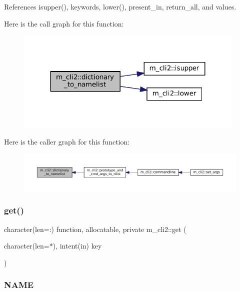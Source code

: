 References isupper(), keywords, lower(), present\+\_\+in, return\+\_\+all, and values.

Here is the call graph for this function\+:\nopagebreak
\begin{figure}[H]
\begin{center}
\leavevmode
\includegraphics[width=311pt]{namespacem__cli2_ab43e4e37723a0acc2183fbbf3d8c36bd_cgraph}
\end{center}
\end{figure}
Here is the caller graph for this function\+:\nopagebreak
\begin{figure}[H]
\begin{center}
\leavevmode
\includegraphics[width=350pt]{namespacem__cli2_ab43e4e37723a0acc2183fbbf3d8c36bd_icgraph}
\end{center}
\end{figure}
\mbox{\label{namespacem__cli2_aa92e8ad0300d4e324e29eae1ab9d04b4}} 
\subsubsection{\texorpdfstring{get()}{get()}}
{\footnotesize\ttfamily character(len=\+:) function, allocatable, private m\+\_\+cli2\+::get (\begin{DoxyParamCaption}\item[{character(len=$\ast$), intent(in)}]{key }\end{DoxyParamCaption})\hspace{0.3cm}{\ttfamily [private]}}



\subsubsection*{N\+A\+ME}

